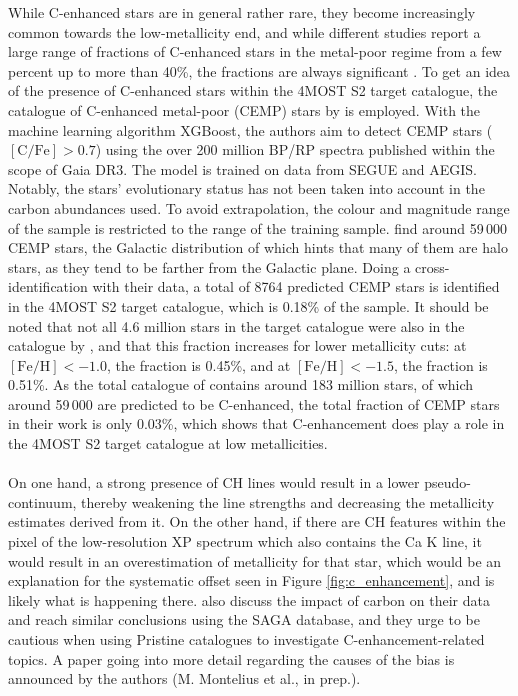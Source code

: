 \documentclass[a4paper,11pt]{article}
\begin{document}
While C-enhanced stars are in general rather rare, they become increasingly common towards the low-metallicity end, and while different studies report a large range of fractions of C-enhanced stars in the metal-poor regime from a few percent up to more than 40\%, the fractions are always significant \citep[e.g.,][]{arentsen22}. To get an idea of the presence of C-enhanced stars within the 4MOST S2 target catalogue, the catalogue of C-enhanced metal-poor (CEMP) stars by \citet{lucey23} is employed. With the machine learning algorithm XGBoost, the authors aim to detect CEMP stars ($\mathrm{[C/Fe]}>0.7$) using the over 200 million BP/RP spectra published within the scope of Gaia DR3. The model is trained on data from SEGUE and AEGIS. Notably, the stars’ evolutionary status has not been taken into account in the carbon abundances used. To avoid extrapolation, the colour and magnitude range of the sample is restricted to the range of the training sample. \citet{lucey23} find around 59\,000 CEMP stars, the Galactic distribution of which hints that many of them are halo stars, as they tend to be farther from the Galactic plane. Doing a cross-identification with their data, a total of 8764 predicted CEMP stars is identified in the 4MOST S2 target catalogue, which is 0.18\% of the sample. It should be noted that not all 4.6 million stars in the target catalogue were also in the catalogue by \citet{lucey23}, and that this fraction increases for lower metallicity cuts: at $\mathrm{[Fe/H]}<-1.0$, the fraction is 0.45\%, and at $\mathrm{[Fe/H]}<-1.5$, the fraction is 0.51\%. As the total catalogue of \citet{lucey23} contains around 183 million stars, of which around 59\,000 are predicted to be C-enhanced, the total fraction of CEMP stars in their work is only 0.03\%, which shows that C-enhancement does play a role in the 4MOST S2 target catalogue at low metallicities.\\ \\
%
On one hand, a strong presence of CH lines would result in a lower pseudo-continuum, thereby weakening the line strengths and decreasing the metallicity estimates derived from it. On the other hand, if there are CH features within the pixel of the low-resolution XP spectrum which also contains the Ca K line, it would result in an overestimation of metallicity for that star, which would be an explanation for the systematic offset seen in Figure \ref{fig:c_enhancement}, and is likely what is happening there. \citet{pristinegaia} also discuss the impact of carbon on their data and reach similar conclusions using the SAGA database, and they urge to be cautious when using Pristine catalogues to investigate C-enhancement-related topics. A paper going into more detail regarding the causes of the bias is announced by the authors (M. Montelius et al., in prep.).
%
\end{document}
